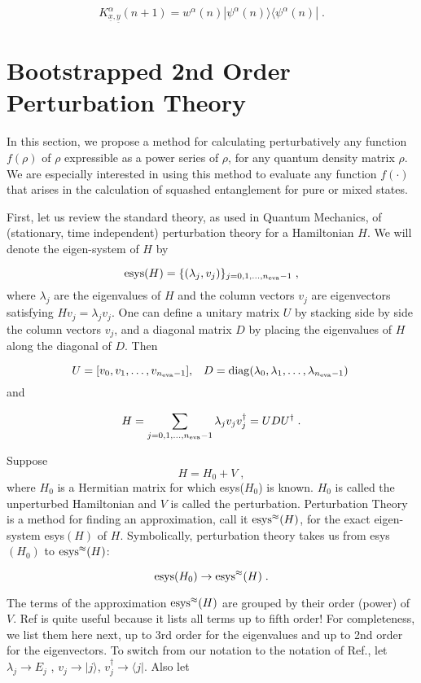 \documentclass[12pt]{article}%
\newcommand{\bra}[1]{\langle#1|}
\newcommand{\ket}[1]{|#1\rangle}
\newcommand{\beq}{\begin{equation}}
\newcommand{\eeq}{\end{equation}}
\newcommand{\rarrow}[0]{\rightarrow}
\newcommand{\ul}[1]{\underline{#1}}
\newcommand{\rvx}[0]{{\ul{x}}}
\newcommand{\rvy}[0]{{\ul{y}}}
\newcommand{\lam}[0]{\lambda}
\newcommand{\nev}[0]{{n_{\rm eva}}}
\newcommand{\alp}[0]{{\alpha}}
\begin{document}
\beq
K^\alp_{\rvx, \rvy}(n+1)=
w^\alp(n)\ket{\psi^\alp(n)}\bra{\psi^\alp(n)}
\;.
\eeq








\section{Bootstrapped 2nd Order Perturbation Theory}

In this section, we
propose a method for calculating perturbatively
any function $f(\rho)$ of $\rho$
 expressible
as a power series of $\rho$, for any quantum density
matrix $\rho$. We are especially interested
in using this method
to evaluate any function  $f(\cdot)$
that arises in the calculation of
squashed entanglement for pure or mixed states.

First, let us review the standard theory,
as used in Quantum Mechanics, of
(stationary, time independent)
 perturbation theory for a Hamiltonian $H$.
 We will denote the eigen-system
 of $H$ by

\beq
{\rm esys}(H) = \{ (\lam_j, v_j)\}_{j=0, 1, ..., \nev-1}
\;,
\eeq
where $\lam_j$ are the
eigenvalues of $H$ and the column vectors $v_j$
are eigenvectors satisfying $Hv_j = \lam_jv_j$.
One can define a unitary matrix $U$
by stacking
side by side the column vectors $v_j$,
and a diagonal matrix $D$
by placing the eigenvalues of
$H$ along the diagonal of $D$. Then

\beq
U = [ v_0, v_1, \ldots, v_{\nev-1}],\;\;\;
D = {\rm diag}(\lam_0, \lam_1, \ldots, \lam_{\nev-1})
\;
\eeq
and

\beq
H = \sum_{j=0, 1, ..., \nev-1} \lam_j v_jv^\dag_j
= UDU^\dag
\;.
\eeq

Suppose
\beq H = H_0 + V
\;,
\eeq
where $H_0$ is a Hermitian matrix for which esys($H_0$)
is known. $H_0$ is called the unperturbed
Hamiltonian and $V$ is called
the perturbation.  Perturbation
Theory is a method for finding an
approximation, call it ${\rm esys}^\approx(H)$,
for the exact eigen-system esys$(H)$ of $H$.
Symbolically, perturbation theory
takes us from esys$(H_0)$
to ${\rm esys}^\approx(H)$:


\beq
{\rm esys}(H_0) \rarrow {\rm esys}^\approx(H)
\;.
\eeq


The terms of the approximation ${\rm esys}^\approx(H)$
are grouped by their order (power) of $V$.
Ref\cite{pert-wiki} is quite useful because
it lists all terms up to fifth order!
 For completeness, we
list them here next,
up to 3rd order for the eigenvalues
and up to 2nd order for the eigenvectors.
To switch from our notation to the notation
of Ref.\cite{pert-wiki}, let
$\lam_j \rarrow E_j$ , $v_j\rarrow \ket{j}$,
$v_j^\dag \rarrow \bra{j}$. Also let
\end{document}
